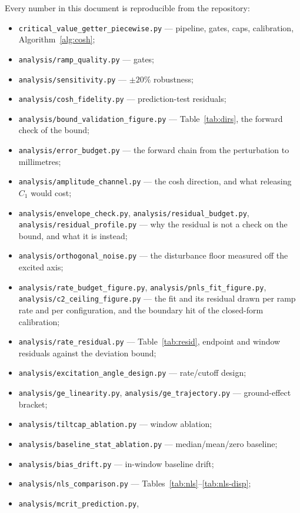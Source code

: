 \documentclass[10pt]{article}
\begin{document}
Every number in this document is reproducible from the repository:
\begingroup\sloppy
\begin{itemize}
\item \texttt{critical\_value\_getter\_piecewise.py} — pipeline,
gates, caps, calibration, Algorithm~\ref{alg:cosh};
\item \texttt{analysis/ramp\_quality.py} — gates;
\item \texttt{analysis/sensitivity.py} — $\pm20\%$ robustness;
\item \texttt{analysis/cosh\_fidelity.py} — prediction-test residuals;
\item \texttt{analysis/bound\_validation\_figure.py} —
Table~\ref{tab:dirs}, the forward check of the bound;
\item \texttt{analysis/error\_budget.py} — the forward chain
from the perturbation to millimetres;
\item \texttt{analysis/amplitude\_channel.py} — the cosh
direction, and what releasing $C_1$ would cost;
\item \texttt{analysis/envelope\_check.py},
\texttt{analysis/residual\_budget.py},
\texttt{analysis/residual\_profile.py} — why the residual is not
a check on the bound, and what it is instead;
\item \texttt{analysis/orthogonal\_noise.py} — the disturbance
floor measured off the excited axis;
\item \texttt{analysis/rate\_budget\_figure.py},
\texttt{analysis/pnls\_fit\_figure.py},
\texttt{analysis/c2\_ceiling\_figure.py} — the fit and its
residual drawn per ramp rate and per configuration, and the
boundary hit of the closed-form calibration;
\item \texttt{analysis/rate\_residual.py} — Table~\ref{tab:resid},
endpoint and window residuals against the deviation bound;
\item \texttt{analysis/excitation\_angle\_design.py} — rate/cutoff
design;
\item \texttt{analysis/ge\_linearity.py},
\texttt{analysis/ge\_trajectory.py} — ground-effect bracket;
\item \texttt{analysis/tiltcap\_ablation.py} — window ablation;
\item \texttt{analysis/baseline\_stat\_ablation.py} —
median/mean/zero baseline;
\item \texttt{analysis/bias\_drift.py} — in-window baseline drift;
\item \texttt{analysis/nls\_comparison.py} —
Tables~\ref{tab:nls}--\ref{tab:nls-disp};
\item \texttt{analysis/mcrit\_prediction.py},

\end{itemize}
\end{document}

